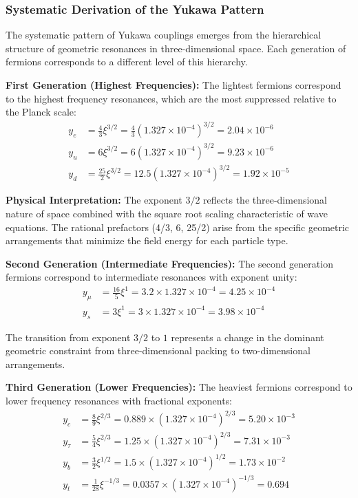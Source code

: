 \documentclass[12pt,a4paper]{article}
\begin{document}
	\subsubsection{Systematic Derivation of the Yukawa Pattern}
	
	The systematic pattern of Yukawa couplings emerges from the hierarchical structure of geometric resonances in three-dimensional space. Each generation of fermions corresponds to a different level of this hierarchy.
	
	\textbf{First Generation (Highest Frequencies):} The lightest fermions correspond to the highest frequency resonances, which are the most suppressed relative to the Planck scale:
	\begin{align}
		y_e &= \frac{4}{3} \xi^{3/2} = \frac{4}{3} (1.327 \times 10^{-4})^{3/2} = 2.04 \times 10^{-6} \\
		y_u &= 6 \xi^{3/2} = 6 (1.327 \times 10^{-4})^{3/2} = 9.23 \times 10^{-6} \\
		y_d &= \frac{25}{2} \xi^{3/2} = 12.5 (1.327 \times 10^{-4})^{3/2} = 1.92 \times 10^{-5}
	\end{align}
	
	\textbf{Physical Interpretation:} The exponent $3/2$ reflects the three-dimensional nature of space combined with the square root scaling characteristic of wave equations. The rational prefactors (4/3, 6, 25/2) arise from the specific geometric arrangements that minimize the field energy for each particle type.
	
	\textbf{Second Generation (Intermediate Frequencies):} The second generation fermions correspond to intermediate resonances with exponent unity:
	\begin{align}
		y_\mu &= \frac{16}{5} \xi^1 = 3.2 \times 1.327 \times 10^{-4} = 4.25 \times 10^{-4} \\
		y_s &= 3 \xi^1 = 3 \times 1.327 \times 10^{-4} = 3.98 \times 10^{-4}
	\end{align}
	
	The transition from exponent $3/2$ to $1$ represents a change in the dominant geometric constraint from three-dimensional packing to two-dimensional arrangements.
	
	\textbf{Third Generation (Lower Frequencies):} The heaviest fermions correspond to lower frequency resonances with fractional exponents:
	\begin{align}
		y_c &= \frac{8}{9} \xi^{2/3} = 0.889 \times (1.327 \times 10^{-4})^{2/3} = 5.20 \times 10^{-3} \\
		y_\tau &= \frac{5}{4} \xi^{2/3} = 1.25 \times (1.327 \times 10^{-4})^{2/3} = 7.31 \times 10^{-3} \\
		y_b &= \frac{3}{2} \xi^{1/2} = 1.5 \times (1.327 \times 10^{-4})^{1/2} = 1.73 \times 10^{-2} \\
		y_t &= \frac{1}{28} \xi^{-1/3} = 0.0357 \times (1.327 \times 10^{-4})^{-1/3} = 0.694
	\end{align}
	
\end{document}
